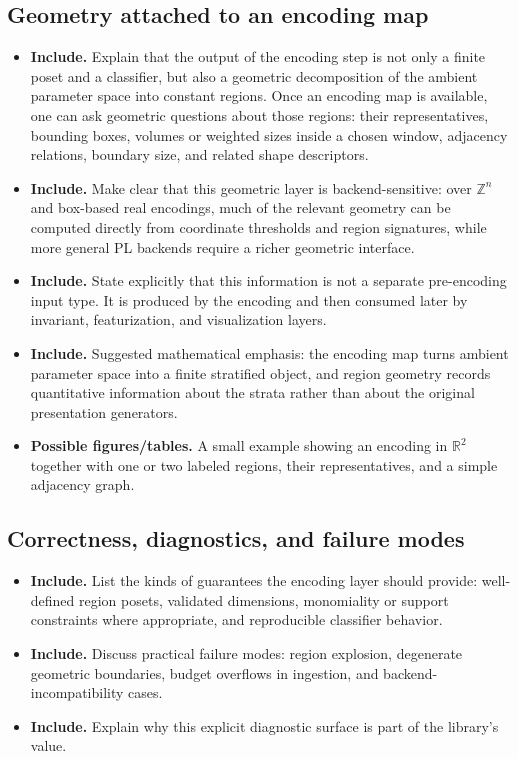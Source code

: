 \documentclass[11pt]{article}
\newcommand{\R}{\mathbb{R}}
\newcommand{\Z}{\mathbb{Z}}
\newenvironment{plan}{\begin{itemize}[leftmargin=1.6em,itemsep=0.35em,topsep=0.25em]}{\end{itemize}}
\newcommand{\includeitems}[1]{\item \textbf{Include.} #1}
\newcommand{\figures}[1]{\item \textbf{Possible figures/tables.} #1}
\begin{document}
\subsection{Geometry attached to an encoding map}

\begin{plan}
    \includeitems{Explain that the output of the encoding step is not only a finite poset and a classifier, but also a geometric decomposition of the ambient parameter space into constant regions. Once an encoding map is available, one can ask geometric questions about those regions: their representatives, bounding boxes, volumes or weighted sizes inside a chosen window, adjacency relations, boundary size, and related shape descriptors.}
    \includeitems{Make clear that this geometric layer is backend-sensitive: over $\Z^n$ and box-based real encodings, much of the relevant geometry can be computed directly from coordinate thresholds and region signatures, while more general PL backends require a richer geometric interface.}
    \includeitems{State explicitly that this information is not a separate pre-encoding input type. It is produced by the encoding and then consumed later by invariant, featurization, and visualization layers.}
    \includeitems{Suggested mathematical emphasis: the encoding map turns ambient parameter space into a finite stratified object, and region geometry records quantitative information about the strata rather than about the original presentation generators.}
    \figures{A small example showing an encoding in $\R^2$ together with one or two labeled regions, their representatives, and a simple adjacency graph.}
\end{plan}

\subsection{Correctness, diagnostics, and failure modes}

\begin{plan}
    \includeitems{List the kinds of guarantees the encoding layer should provide: well-defined region posets, validated dimensions, monomiality or support constraints where appropriate, and reproducible classifier behavior.}
    \includeitems{Discuss practical failure modes: region explosion, degenerate geometric boundaries, budget overflows in ingestion, and backend-incompatibility cases.}
    \includeitems{Explain why this explicit diagnostic surface is part of the library's value.}
\end{plan}
\end{document}
